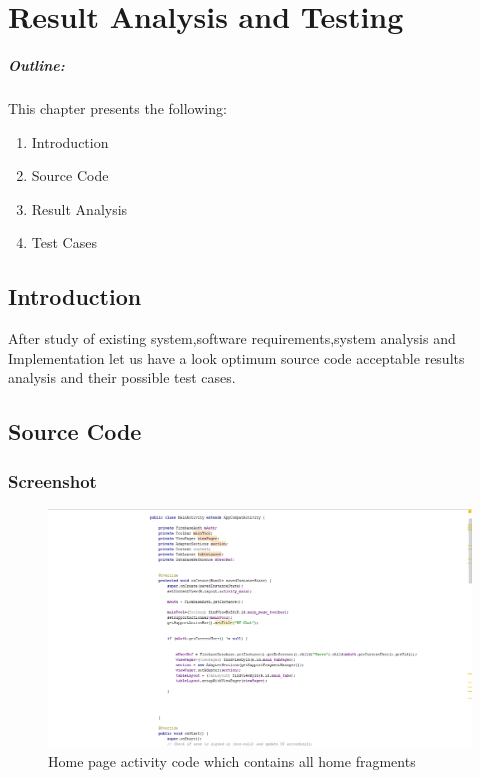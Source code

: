 \chapter{Result Analysis and Testing}\label{chap4}



\vspace*{40 ex}
\paragraph*{Outline:} This chapter presents the following:
\begin{enumerate}
\setlength{\itemsep}{-0.3em}
\item Introduction
\item Source Code
\item Result Analysis 
\item Test Cases
\end{enumerate}

\newpage

\section{Introduction}\label{chap4:intro}
After study of existing system,software requirements,system analysis and Implementation let us have a look optimum source code acceptable results analysis and their possible test cases.

\section{Source Code}

\subsection{Screenshot}

\begin{figure}[!ht]
	\centering
	\includegraphics[scale=0.2]{main.png}
	\caption{\label{img11} Home page activity code which contains all home fragments }
\end{figure}

